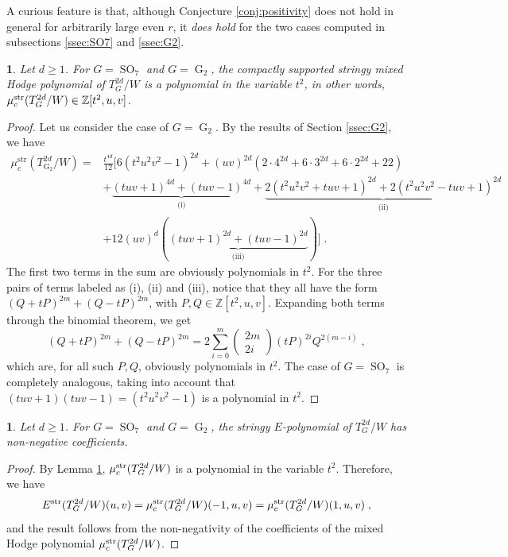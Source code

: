 \documentclass[11pt,english]{amsart}
\numberwithin{equation}{section}
\numberwithin{figure}{section}
\theoremstyle{plain}
\newtheorem{cor}[thm]{\protect\corollaryname}
\theoremstyle{plain}
\newtheorem{lem}[thm]{\protect\lemmaname}
\theoremstyle{definition}
\theoremstyle{remark}
\newcommand{\ZZ}{\mathbb{Z}}
\newcommand{\SO}{\operatorname{SO}}
\newcommand{\G}{\operatorname{G}}
\newcommand{\str}{\textup{str}}
\providecommand{\corollaryname}{Corollary}
\providecommand{\lemmaname}{Lemma}
\begin{document}
A curious feature is that, although Conjecture \ref{conj:positivity} does not hold in general for arbitrarily large even $r$, it \emph{does hold} for the two cases computed in subsections \ref{ssec:SO7} and \ref{ssec:G2}. 

\begin{lem}\label{lem:polynomial-t2}
Let $d \geq 1$. For $G = \SO_7$ and $G = \G_2$, the compactly supported stringy mixed Hodge polynomial of $T_{G}^{2d}/W$ is a polynomial in the variable $t^2$, in other words, $\mu_c^\str(T_{G}^{2d}/W) \in \ZZ[t^2, u, v]$.
\end{lem}

\begin{proof}
Let us consider the case of $G = \G_2$. By the results of Section \ref{ssec:G2}, we have
\begin{align*}
   \mu^{\mathrm{str}}_c(T_{\G_2}^{2d}/W) = & \frac{t^{4d}}{12} \bigg[ 6(t^2u^2v^2-1)^{2d} + (uv)^{2d} \left( 2 \cdot 4^{2d} + 6 \cdot 3^{2d} +6 \cdot 2^{2d} + 22 \right)  \\
   & + \underbrace{(tuv+1)^{4d} + (tuv-1)^{4d}}_{\textrm{(i)}} + \underbrace{2(t^2u^2v^2+tuv+1)^{2d} + 2(t^2u^2v^2-tuv+1)^{2d}}_{\textrm{(ii)}} \\
    & + 12(uv)^{d} ( \underbrace{(tuv+1)^{2d} + (tuv-1)^{2d}}_{\textrm{(iii)}} ) \bigg]\; .
\end{align*}
The first two terms in the sum are obviously polynomials in $t^2$. For the three pairs of terms labeled as (i), (ii) and (iii), notice that they all have the form $(Q + tP)^{2m} + (Q - tP)^{2m}$, with $P, Q \in \ZZ[t^2, u, v]$. Expanding both terms through the binomial theorem, we get
$$
(Q + tP)^{2m} + (Q - tP)^{2m} = 2\sum_{i = 0}^m \left(\begin{matrix}
2m \\ 2i 
\end{matrix}\right) (tP)^{2i} Q^{2(m-i)}\; ,
$$
which are, for all such $P,Q$, obviously polynomials in $t^2$. The case of $G = \SO_7$ is completely analogous, taking into account that $(tuv+1)(tuv-1) = (t^2u^2v^2-1)$ is a polynomial in $t^2$.
\end{proof}

\begin{cor}
\label{cor:G2_SO7_conj}
    Let $d \geq 1$. For $G = \SO_7$ and $G = \G_2$, the stringy $E$-polynomial of $T_{G}^{2d}/W$ has non-negative coefficients.
\end{cor}

\begin{proof}
    By Lemma \ref{lem:polynomial-t2}, $\mu_c^\str(T_{G}^{2d}/W)$ is a polynomial in the variable $t^2$. Therefore, we have
    $$
        E^\str(T_{G}^{2d}/W)(u,v) = \mu_c^\str(T_{G}^{2d}/W)(-1, u, v) = \mu_c^\str(T_{G}^{2d}/W)(1, u, v)\; ,
    $$
    and the result follows from the non-negativity of the coefficients of the mixed Hodge polynomial $\mu_c^\str(T_{G}^{2d}/W)$.
\end{proof}
\end{document}
